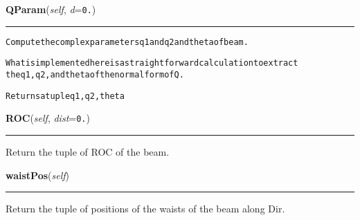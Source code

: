 \hspace{.8\funcindent}\begin{boxedminipage}{\funcwidth}

    \raggedright \textbf{QParam}(\textit{self}, \textit{d}={\tt 0.})

    \vspace{-1.5ex}

    \rule{\textwidth}{0.5\fboxrule}
\setlength{\parskip}{2ex}
\begin{alltt}
Compute the complex parameters q1 and q2 and theta of beam.

What is implemented here is a straightforward calculation to extract
the q1, q2, and theta of the normal form of Q.

    Returns a tuple q1, q2, theta
\end{alltt}

\setlength{\parskip}{1ex}
    \end{boxedminipage}

    \label{theia:optics:beam:GaussianBeam:ROC}

    \vspace{0.5ex}

\hspace{.8\funcindent}\begin{boxedminipage}{\funcwidth}

    \raggedright \textbf{ROC}(\textit{self}, \textit{dist}={\tt 0.})

    \vspace{-1.5ex}

    \rule{\textwidth}{0.5\fboxrule}
\setlength{\parskip}{2ex}
    Return the tuple of ROC of the beam.

\setlength{\parskip}{1ex}
    \end{boxedminipage}

    \label{theia:optics:beam:GaussianBeam:waistPos}

    \vspace{0.5ex}

\hspace{.8\funcindent}\begin{boxedminipage}{\funcwidth}

    \raggedright \textbf{waistPos}(\textit{self})

    \vspace{-1.5ex}

    \rule{\textwidth}{0.5\fboxrule}
\setlength{\parskip}{2ex}
    Return the tuple of positions of the waists of the beam along Dir.

\setlength{\parskip}{1ex}
    \end{boxedminipage}


